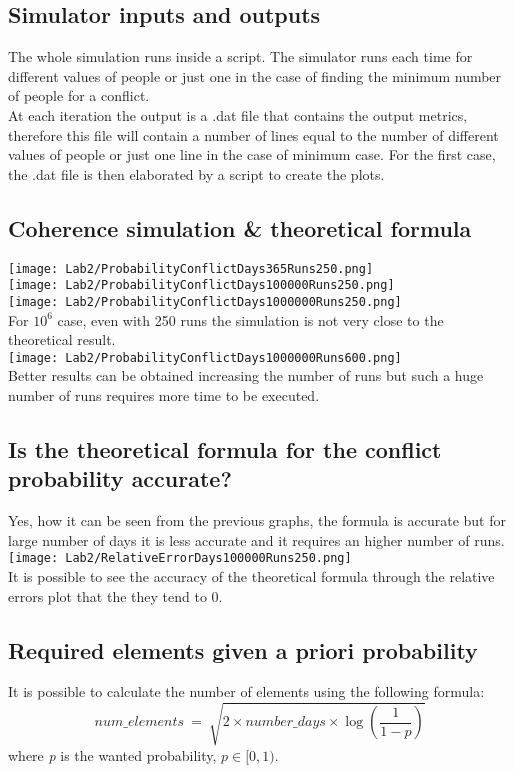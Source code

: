 \documentclass[twocolumn,letterpaper]{report}
\begin{document}
{	\subsection{Simulator inputs and outputs}
			The whole simulation runs inside a script. The simulator runs each time for different values of people or just one in the case of finding the minimum number of people for a conflict. \\
			At each iteration the output is a .dat file that contains the output metrics, therefore this file will contain a number of lines equal to the number of different values of people or just one line in the case of minimum case. For the first case, the .dat file is then elaborated by a script to create the plots.
		
		\subsection{Coherence simulation \& theoretical formula}
				\texttt{[image: Lab2/ProbabilityConflictDays365Runs250.png]} \\
				\texttt{[image: Lab2/ProbabilityConflictDays100000Runs250.png]} \\
				\texttt{[image: Lab2/ProbabilityConflictDays1000000Runs250.png]} \\
				For $10^6$ case, even with 250 runs the simulation is not very close to the theoretical result. \\
				\texttt{[image: Lab2/ProbabilityConflictDays1000000Runs600.png]} \\
				Better results can be obtained increasing the number of runs but such a huge number of runs requires more time to be executed.
				
		\subsection{Is the theoretical formula for the conflict probability accurate?}
				Yes, how it can be seen from the previous graphs, the formula is accurate but for large number of days it is less accurate and it requires an higher number of runs.
				\texttt{[image: Lab2/RelativeErrorDays100000Runs250.png]} \\
				It is possible to see the accuracy of the theoretical formula through the relative errors plot that the they tend to 0.
				
				
		\subsection{Required elements given a priori probability}
				It is possible to calculate the number of elements using the following formula:
				\[
						num\_elements \: = \: \sqrt{2 \times number\_days \times \log{ \left( \frac{1}{1-p} \right) } }
				\]
							where \emph{p} is the wanted probability, $ p \in [0,1)$. \\
							
}
\end{document}
